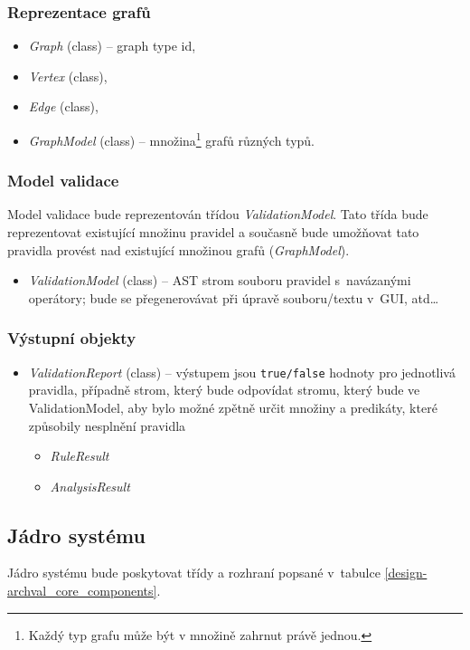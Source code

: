 \subsubsection{Reprezentace grafů}
\begin{itemize}
\item \emph{Graph} (class) -- graph type id,
\item \emph{Vertex} (class),
\item \emph{Edge} (class),
\item \emph{GraphModel} (class) -- množina\footnote{Každý typ grafu může být v množině zahrnut právě jednou.} grafů různých typů.
\end{itemize}

\subsubsection{Model validace}
Model validace bude reprezentován třídou \emph{ValidationModel}. Tato třída bude reprezentovat existující množinu pravidel a současně bude umožňovat tato pravidla provést nad existující množinou grafů (\emph{GraphModel}).
\begin{itemize}
\item \emph{ValidationModel} (class) -- AST strom souboru pravidel s~navázanými operátory; bude se přegenerovávat při úpravě souboru/textu v~GUI, atd\ldots
\end{itemize}

\subsubsection{Výstupní objekty}
\begin{itemize}
\item \emph{ValidationReport} (class) -- výstupem jsou \verb+true/false+ hodnoty pro jednotlivá pravidla, případně strom, který bude odpovídat stromu, který bude ve ValidationModel, aby bylo možné zpětně určit množiny a predikáty, které způsobily nesplnění pravidla
\begin{itemize}
\item \emph{RuleResult}
\item \emph{AnalysisResult}
\end{itemize}
\end{itemize}

\subsection{Jádro systému}
Jádro systému bude poskytovat třídy a rozhraní popsané v~tabulce \ref{design-archval_core_components}.

